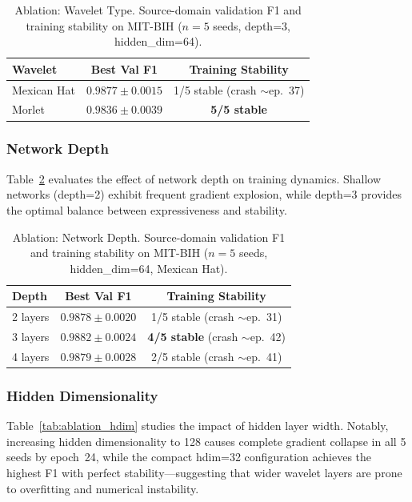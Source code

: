\documentclass[journal,twoside,web]{ieeecolor}
\begin{document}
\begin{table}[!t]
\centering
\caption{Ablation: Wavelet Type. Source-domain validation F1 and training stability on MIT-BIH ($n=5$ seeds, depth=3, hidden\_dim=64).}
\label{tab:ablation_wavelet}
\begin{tabular}{@{}lcc@{}}
\toprule
\textbf{Wavelet} & \textbf{Best Val F1} & \textbf{Training Stability} \\
\midrule
Mexican Hat    & $0.9877 \pm 0.0015$ & 1/5 stable (crash $\sim$ep.~37) \\
Morlet         & $0.9836 \pm 0.0039$ & \textbf{5/5 stable} \\
\bottomrule
\end{tabular}
\end{table}

\subsubsection{Network Depth}
Table~\ref{tab:ablation_depth} evaluates the effect of network depth on training dynamics. Shallow networks (depth=2) exhibit frequent gradient explosion, while depth=3 provides the optimal balance between expressiveness and stability.

\begin{table}[!t]
\centering
\caption{Ablation: Network Depth. Source-domain validation F1 and training stability on MIT-BIH ($n=5$ seeds, hidden\_dim=64, Mexican Hat).}
\label{tab:ablation_depth}
\begin{tabular}{@{}lcc@{}}
\toprule
\textbf{Depth} & \textbf{Best Val F1} & \textbf{Training Stability} \\
\midrule
2 layers       & $0.9878 \pm 0.0020$ & 1/5 stable (crash $\sim$ep.~31) \\
3 layers       & $0.9882 \pm 0.0024$ & \textbf{4/5 stable} (crash $\sim$ep.~42) \\
4 layers       & $0.9879 \pm 0.0028$ & 2/5 stable (crash $\sim$ep.~41) \\
\bottomrule
\end{tabular}
\end{table}

\subsubsection{Hidden Dimensionality}
Table~\ref{tab:ablation_hdim} studies the impact of hidden layer width. Notably, increasing hidden dimensionality to 128 causes complete gradient collapse in all 5 seeds by epoch~24, while the compact hdim=32 configuration achieves the highest F1 with perfect stability---suggesting that wider wavelet layers are prone to overfitting and numerical instability.
\end{document}
